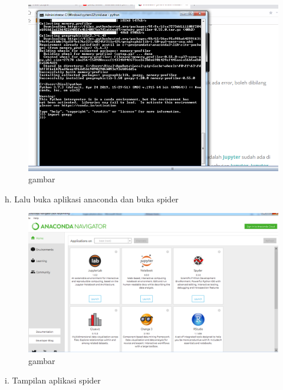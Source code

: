\begin{enumerate}
\begin{figure}
\begin{center} 
\includegraphics[scale=0.4]{src/soal5phyton6.PNG} 
\caption{gambar} 
\label{unhas} 
\end{center} 
\end{figure}

h.	Lalu buka aplikasi anaconda dan buka spider

\begin{figure}
\begin{center} 
\includegraphics[scale=0.4]{src/soal5phyton7.PNG} 
\caption{gambar} 
\label{unhas} 
\end{center} 
\end{figure}

i.	Tampilan aplikasi spider


\end{enumerate}
